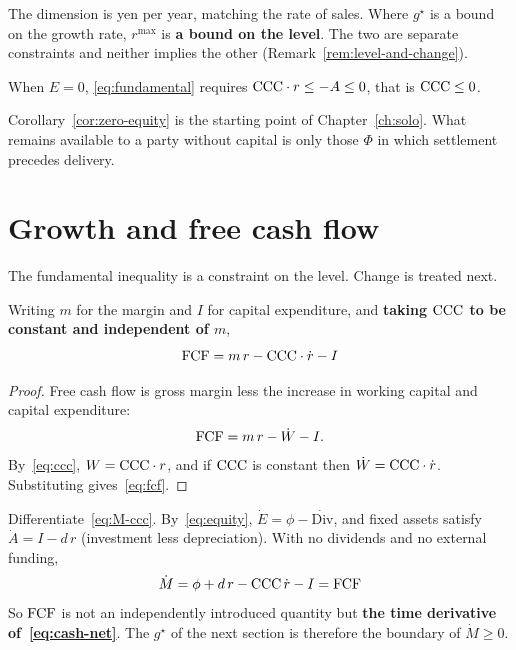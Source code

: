 The dimension is yen per year, matching the rate of sales.
Where $g^\star$ is a bound on the growth rate, $r^{\max}$ is \textbf{a bound on the level}.
The two are separate constraints and neither implies the other
(Remark~\ref{rem:level-and-change}).

\begin{corollary}
\label{cor:zero-equity}
When $E=0$, \eqref{eq:fundamental} requires $\mathrm{CCC}\cdot r\leq -A\leq 0$, that is
$\mathrm{CCC}\leq 0$.
\end{corollary}

Corollary~\ref{cor:zero-equity} is the starting point of Chapter~\ref{ch:solo}.
What remains available to a party without capital is only those $\Phi$ in which settlement
precedes delivery.

\section{Growth and free cash flow}
\label{sec:fcf}

The fundamental inequality is a constraint on the level. Change is treated next.

\begin{proposition}
\label{prop:fcf}
Writing $m$ for the margin and $I$ for capital expenditure, and
\textbf{taking $\mathrm{CCC}$ to be constant and independent of $m$},
\begin{equation}
\FCF = m\,r - \CCC\cdot\dot{r} - I
\label{eq:fcf}
\end{equation}
\end{proposition}

\begin{proof}
Free cash flow is gross margin less the increase in working capital and capital expenditure:
\[
\FCF = m\,r - \dot{W} - I .
\]
By~\eqref{eq:ccc}, $W=\mathrm{CCC}\cdot r$, and if $\mathrm{CCC}$ is constant then
$\dot W = \CCC\cdot\dot r$. Substituting gives~\eqref{eq:fcf}.
\end{proof}

\begin{remark}
\label{rem:fcf-is-mdot}
Differentiate~\eqref{eq:M-ccc}. By~\eqref{eq:equity}, $\dot E=\phi-\dot{\mathrm{Div}}$, and
fixed assets satisfy $\dot A = I - d\,r$ (investment less depreciation). With no dividends
and no external funding,
\[
\dot M = \phi + d\,r - \CCC\,\dot r - I = \FCF
\]
So $\mathrm{FCF}$ is not an independently introduced quantity but \textbf{the time derivative
of~\eqref{eq:cash-net}}. The $g^\star$ of the next section is therefore the boundary of
$\dot M\geq 0$.
\end{remark}

